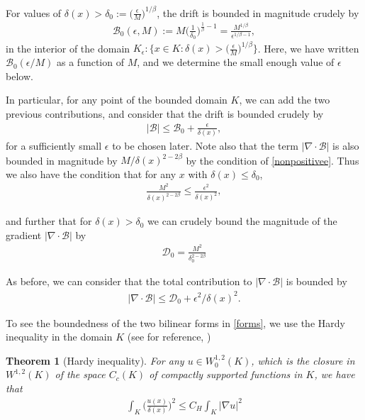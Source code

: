\documentclass{article}
\theoremstyle{plain}
\newtheorem{theorem}{Theorem}
\theoremstyle{definition}
\theoremstyle{plain}
\newcommand{\D}{\mathcal{D}}
\newcommand{\eps}{\epsilon}
\newcommand{\B}{\mathcal{B}}
\begin{document}
For values of $\delta(x)> \delta_0 :=\big( \frac{\eps}{M} \big)^{1/\beta}$, the drift is bounded in magnitude crudely by 
\begin{align}
    \B_0 (\eps,M) := M\Big(\frac{1}{\delta_0}\Big)^{\frac{1}{\beta} -1}=\frac{M^{1/\beta}}{\eps^{1/\beta -1} },
\end{align}
in the interior of the domain $K_\eps:\{x\in K: \delta(x)> \big( \frac{\eps}{M} \big)^{1/\beta}\}$. Here, we have written $\B_0 (\eps/M)$ as a function of $M$, and we determine the small enough value of $\eps$ below.

In particular, for any point of the bounded domain $K$, we can add the two previous contributions, and consider that the drift is bounded crudely by 
\begin{align}
|\B|\leq \B_0 +\frac{\eps}{\delta(x)},
\end{align}
for a sufficiently small $\eps$ to be chosen later. Note also that the term $|\nabla\cdot \B|$ is also bounded in magnitude by $M/\delta(x)^{2-2\beta}$ by the condition of \cref{nonpositivee}. Thus we also have the condition that for any $x$ with $\delta(x)\leq \delta_0$, 
\begin{align}
    \frac{M^2}{\delta(x)^{2-2\beta}}\leq \frac{\eps^2}{\delta(x)^{2}}, 
\end{align}

and further that for $\delta(x)>\delta_0$ we can crudely bound the magnitude of the gradient $|\nabla\cdot \B|$ by 
\begin{align}
    \D_0 =\frac{M^{2}}{\delta_{0}^{2-2\beta}}
\end{align}

As before, we can consider that the total contribution to $|\nabla\cdot \B|$ is bounded by 
\begin{align}
|\nabla\cdot \B|\leq \D_0 +\eps^2/\delta(x)^{2}.
\end{align}

To see the boundedness of the two bilinear forms in \cref{forms}, we use the Hardy inequality in the domain $K$ (see for reference, \cite{Hof25, KLT11})
\begin{theorem}[Hardy inequality]\label{hardy}
    For any $u \in W^{1,2}_0(K)$, which is the closure in $W^{1,2}(K)$ of the space $C_{c}(K)$ of compactly supported functions in $K$, we have that \begin{align}
        \int_K \Big(\frac{u(x)}{\delta(x)}\Big)^{2}\leq C_H \int_K |\nabla u|^2
    \end{align}
\end{theorem}
\end{document}
